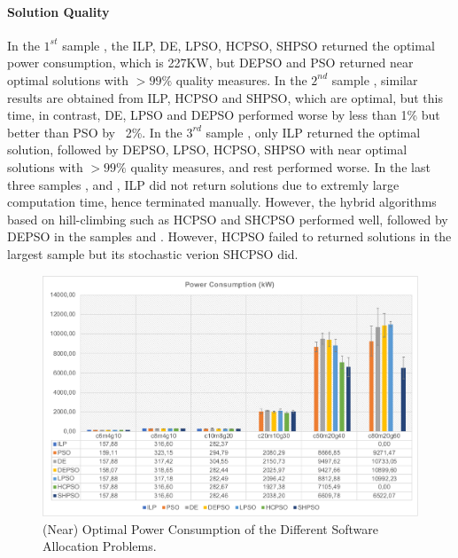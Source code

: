 \paragraph{Solution Quality} In the $1^{st}$ sample , the ILP, DE, LPSO, HCPSO, SHPSO returned the optimal power consumption, which is 227KW, but DEPSO and PSO returned near optimal solutions with $>99\%$ quality measures. In the $2^{nd}$ sample  , similar results are obtained from ILP, HCPSO and SHPSO, which are optimal, but this time, in contrast, DE, LPSO and DEPSO performed worse by less than 1\% but better than PSO by ~2\%.  In the $3^{rd}$ sample , only ILP returned the optimal solution, followed by DEPSO, LPSO, HCPSO, SHPSO with near optimal solutions with $>99\%$ quality measures, and rest performed worse. In the last three samples ,  and  , ILP did not return solutions due to extremly large computation time, hence terminated manually. However, the hybrid algorithms based on hill-climbing such as HCPSO and SHCPSO performed well, followed by DEPSO in the samples  and  . However, HCPSO failed to returned solutions in the largest sample  but its stochastic verion SHCPSO did.
\begin{figure}[h!]
\centering
\includegraphics[width=1\linewidth]{img/power_consumption.pdf}
\caption{(Near) Optimal Power Consumption of the Different Software Allocation Problems.}
\label{fig_powerconsumption_ilp_metaheuristic}\vspace{-0.4cm}
\end{figure}

